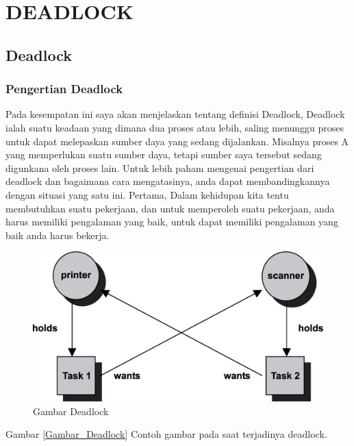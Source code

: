 
\section {DEADLOCK}

\subsection {Deadlock}
\subsubsection {Pengertian Deadlock}
	Pada kesempatan ini saya akan menjelaskan tentang definisi Deadlock, Deadlock ialah suatu keadaan yang dimana dua proses atau lebih, saling menunggu proses untuk dapat melepaskan sumber daya yang sedang dijalankan. Misalnya proses A yang memperlukan suatu sumber daya, tetapi sumber saya tersebut sedang digunkana oleh proses lain. Untuk lebih paham mengenai pengertian dari deadlock dan bagaimana cara mengatasinya, anda dapat membandingkannya dengan situasi yang satu ini. Pertama, Dalam kehidupan kita tentu membutuhkan suatu pekerjaan, dan untuk memperoleh suatu pekerjaan, anda harus memiliki pengalaman yang baik, untuk dapat memiliki pengalaman yang baik anda harus bekerja.

	\begin{figure}[ht]
	\centerline{\includegraphics[width=1\textwidth]{figures/deadlock1.jpg}}
	\caption{Gambar Deadlock}
	\label{Gambar}
	\end{figure}
      
      Gambar \ref{Gambar_Deadlock} Contoh gambar pada saat terjadinya deadlock.

